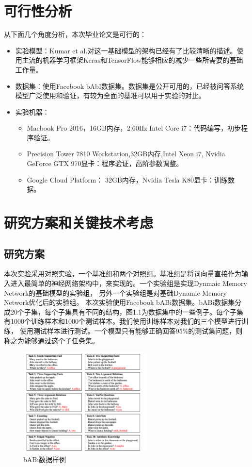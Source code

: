\section{可行性分析}
从下面几个角度分析，本次毕业论文是可行的：
\begin{itemize}
\item 实验模型：Kumar et al.\cite{DBLP:journals/corr/KumarISBEPOGS15}对这一基础模型的架构已经有了比较清晰的描述。使用主流的机器学习框架Keras和TensorFlow能够相应的减少一些所需要的基础工作量。
\item 数据集：使用Facebook bAbI数据集。数据集是公开可用的，已经被问答系统模型广泛使用和验证，有较为全面的基准可以用于实验的对比。
\item 实验机器：
    \begin{itemize}
    \item Macbook Pro 2016，16GB内存，2.60Hz Intel Core i7：代码编写，初步程序验证。
    \item Precision Tower 7810 Workstation,32GB内存,Intel Xeon i7, Nvidia GeForce GTX 970显卡：程序验证，高阶参数调整。
    \item Google Cloud Platform： 32GB内存，Nvidia Tesla K80显卡：训练数据。 
    \end{itemize}
\end{itemize}
\section{研究方案和关键技术考虑}
\subsection{研究方案}
本次实验采用对照实验，一个基准组和两个对照组。基准组是将词向量直接作为输入进入最简单的神经网络架构中，来实现的。一个实验组是实现Dynmaic Memory Network的基础模型的实验组，
另外一个实验组是对基础Dynamic Memory Network优化后的实验组。
本次实验使用Facebook bABi数据集。bABi数据集分成20个子集，每个子集具有不同的结构，图1.1为数据集中的一些例子\cite{DBLP:journals/corr/WestonBCM15}。每个子集有1000个训练样本和1000个测试样本。我们使用训练样本对我们的三个模型进行训练，
使用测试样本进行测试。一个模型只有能够正确回答95\%的测试集问题，则称之为能够通过这个子任务集。
\begin{figure}[h]
    \centering
    \includegraphics[width=0.6\textwidth]{./images/dataset-example}
      \caption{bABi数据样例}
    \end{figure} 
